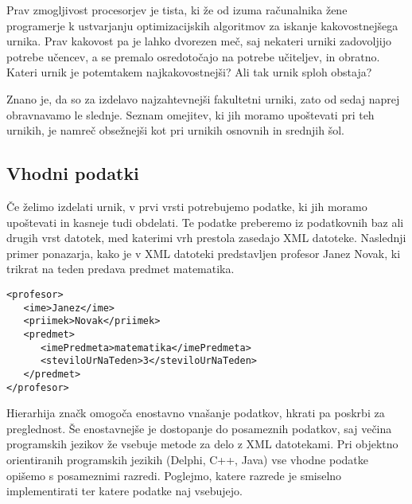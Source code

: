 \documentclass[a4paper, 10pt]{article}
\begin{document}
Prav zmogljivost procesorjev je tista, ki že od izuma računalnika žene programerje k
ustvarjanju optimizacijskih algoritmov za iskanje kakovostnejšega urnika. Prav kakovost
pa je lahko dvorezen meč, saj nekateri urniki zadovoljijo potrebe učencev, a se premalo
osredotočajo na potrebe učiteljev, in obratno. Kateri urnik je potemtakem najkakovostnejši?
Ali tak urnik sploh obstaja?

Znano je, da so za izdelavo najzahtevnejši fakultetni urniki, zato od sedaj naprej
obravnavamo le slednje. Seznam omejitev, ki jih moramo upoštevati pri teh urnikih,
je namreč obsežnejši kot pri urnikih osnovnih in srednjih šol.

\subsection{Vhodni podatki}

Če želimo izdelati urnik, v prvi vrsti potrebujemo podatke, ki jih moramo upoštevati in
kasneje tudi obdelati. Te podatke preberemo iz podatkovnih baz ali drugih vrst datotek,
med katerimi vrh prestola zasedajo XML datoteke. Naslednji primer ponazarja, kako je v
XML datoteki predstavljen profesor Janez Novak, ki trikrat na teden predava predmet
matematika.


\begin{verbatim}
<profesor>
   <ime>Janez</ime>
   <priimek>Novak</priimek>
   <predmet>
      <imePredmeta>matematika</imePredmeta>
      <steviloUrNaTeden>3</steviloUrNaTeden>
   </predmet>
</profesor>
\end{verbatim}

Hierarhija značk omogoča enostavno vnašanje podatkov, hkrati pa poskrbi za preglednost.
Še enostavnejše je dostopanje do posameznih podatkov, saj večina programskih jezikov že
vsebuje metode za delo z XML datotekami.
Pri objektno orientiranih programskih jezikih (Delphi, C++, Java) vse vhodne podatke
opišemo s posameznimi razredi. Poglejmo, katere razrede je smiselno implementirati ter
katere podatke naj vsebujejo.
\end{document}

